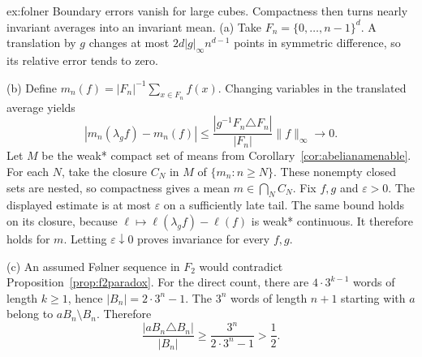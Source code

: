 \begin{solution}{ex:folner}
\idea Boundary errors vanish for large cubes. Compactness then turns nearly invariant averages into an invariant mean.
\writeup (a) Take $F_n=\{0,\ldots,n-1\}^d$. A translation by $g$ changes at most $2d|g|_\infty n^{d-1}$ points in symmetric difference, so its relative error tends to zero.

(b) Define $m_n(f)=|F_n|^{-1}\sum_{x\in F_n}f(x)$. Changing variables in the translated average yields
\[|m_n(\lambda_gf)-m_n(f)|\le\frac{|g^{-1}F_n\triangle F_n|}{|F_n|}\|f\|_\infty\longrightarrow0.
\]
Let $M$ be the weak* compact set of means from Corollary~\ref{cor:abelianamenable}. For each $N$, take the closure $C_N$ in $M$ of $\{m_n:n\ge N\}$. These nonempty closed sets are nested, so compactness gives a mean $m\in\bigcap_N C_N$. Fix $f,g$ and $\varepsilon>0$. The displayed estimate is at most $\varepsilon$ on a sufficiently late tail. The same bound holds on its closure, because $\ell\mapsto\ell(\lambda_gf)-\ell(f)$ is weak* continuous. It therefore holds for $m$. Letting $\varepsilon\downarrow0$ proves invariance for every $f,g$.

(c) An assumed F{\o}lner sequence in $F_2$ would contradict Proposition~\ref{prop:f2paradox}. For the direct count, there are $4\cdot3^{k-1}$ words of length $k\ge1$, hence $|B_n|=2\cdot3^n-1$. The $3^n$ words of length $n+1$ starting with $a$ belong to $aB_n\setminus B_n$. Therefore
\[\frac{|aB_n\triangle B_n|}{|B_n|}\ge\frac{3^n}{2\cdot3^n-1}>\frac12.
\]
\end{solution}
